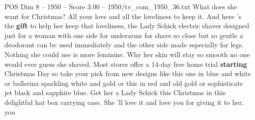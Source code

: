 \begin{textsample}{POS Dim 8 – 1950 – Score 3.00 – 1950/tv\_com\_1950\_36.txt}  \label{ex:f8_pos_006}
What does she want for Christmas?
All your love and all the loveliness to keep it.
And here 's the \textbf{gift} to help her keep that loveliness, the Lady Schick electric shaver designed just for a woman with one side for underarms for shave so close but so gentle a deodorant can be used immediately and the other side made especially for legs.
Nothing she could use is more feminine.
Why her skin will stay so smooth no one would ever guess she shaved.
Most stores offer a 14-day free home trial \textbf{starting} Christmas Day so take your pick from new designs like this one in blue and white or ballerina sparkling white and gold or this in red and old gold or sophisticate jet black and sapphire blue.
Get her a Lady Schick this Christmas in this delightful hat box carrying case.
She 'll love it and love you for giving it to her. you

\end{textsample}
